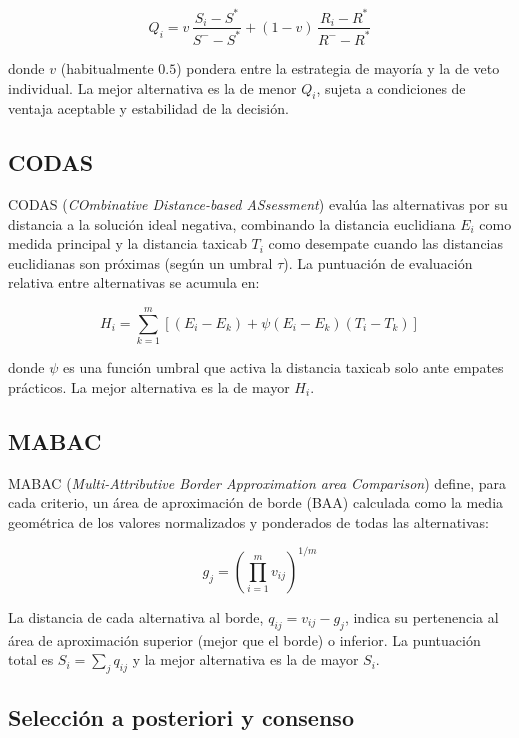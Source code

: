 \begin{equation}
Q_i = v \, \frac{S_i - S^*}{S^- - S^*} + (1 - v) \, \frac{R_i - R^*}{R^- - R^*}
\end{equation}

donde $v$ (habitualmente $0.5$) pondera entre la estrategia de mayoría y la de veto individual. La mejor alternativa es la de menor $Q_i$, sujeta a condiciones de ventaja aceptable y estabilidad de la decisión.

\subsection{CODAS}

CODAS (\textit{COmbinative Distance-based ASsessment}) \citep{KeshavarzGhorabaee2016} evalúa las alternativas por su distancia a la solución ideal negativa, combinando la distancia euclidiana $E_i$ como medida principal y la distancia taxicab $T_i$ como desempate cuando las distancias euclidianas son próximas (según un umbral $\tau$). La puntuación de evaluación relativa entre alternativas se acumula en:

\begin{equation}
H_i = \sum_{k=1}^{m} \left[ (E_i - E_k) + \psi(E_i - E_k)(T_i - T_k) \right]
\end{equation}

donde $\psi$ es una función umbral que activa la distancia taxicab solo ante empates prácticos. La mejor alternativa es la de mayor $H_i$.

\subsection{MABAC}

MABAC (\textit{Multi-Attributive Border Approximation area Comparison}) \citep{Pamucar2015} define, para cada criterio, un área de aproximación de borde (BAA) calculada como la media geométrica de los valores normalizados y ponderados de todas las alternativas:

\begin{equation}
g_j = \left( \prod_{i=1}^{m} v_{ij} \right)^{1/m}
\end{equation}

La distancia de cada alternativa al borde, $q_{ij} = v_{ij} - g_j$, indica su pertenencia al área de aproximación superior (mejor que el borde) o inferior. La puntuación total es $S_i = \sum_j q_{ij}$ y la mejor alternativa es la de mayor $S_i$.

\subsection{Selección a posteriori y consenso}

